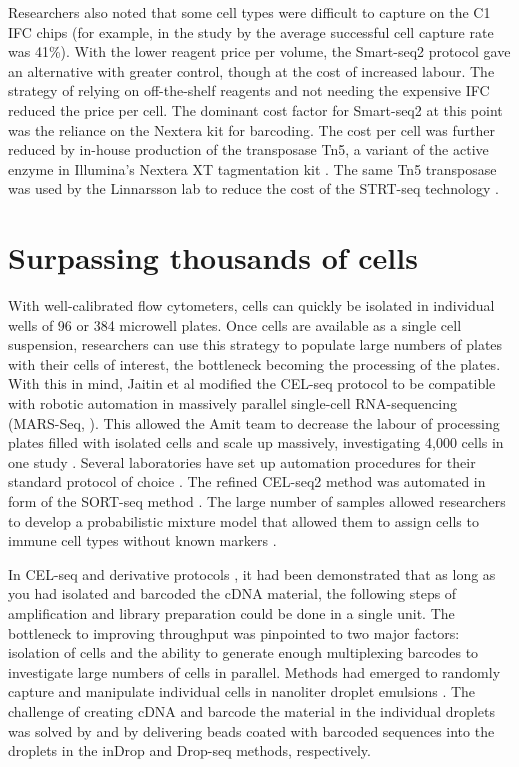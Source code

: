 Researchers also noted that some cell types were difficult to capture on the C1 IFC chips (for example, in the study by \citet{Zeisel2015-mk} the average successful cell capture rate was 41\%). With the lower reagent price per volume, the Smart-seq2 protocol gave an alternative with greater control, though at the cost of increased labour. The strategy of relying on off-the-shelf reagents and not needing the expensive IFC reduced the price per cell. The dominant cost factor for Smart-seq2 at this point was the reliance on the Nextera kit for barcoding. The cost per cell was further reduced by in-house production of the transposase Tn5, a variant of the active enzyme in Illumina’s Nextera XT tagmentation kit \cite{Picelli2014-ni}. The same Tn5 transposase was used by the Linnarsson lab to reduce the cost of the STRT-seq technology \cite{Islam2014-dx}.

\section{Surpassing thousands of cells}

With well-calibrated flow cytometers, cells can quickly be isolated in individual wells of 96 or 384 microwell plates. Once cells are available as a single cell suspension, researchers can use this strategy to populate large numbers of plates with their cells of interest, the bottleneck becoming the processing of the plates. With this in mind, Jaitin et al modified the CEL-seq protocol to be compatible with robotic automation in massively parallel single-cell RNA-sequencing (MARS-Seq, \citet{Jaitin2014-pk}). This allowed the Amit team to decrease the labour of processing plates filled with isolated cells and scale up massively, investigating 4,000 cells in one study \cite{Jaitin2014-pk}. Several laboratories have set up automation procedures for their standard protocol of choice \cite{Zeisel2015-mk, Soumillon2014-mf}. The refined CEL-seq2 method \cite{Hashimshony2016-ul} was automated in form of the SORT-seq method \cite{Muraro2016-zt}. The large number of samples allowed researchers to develop a probabilistic mixture model that allowed them to assign cells to immune cell types without known markers \cite{Jaitin2014-pk}.

In CEL-seq and derivative protocols \cite{Hashimshony2012-am, Jaitin2014-pk, Hashimshony2016-ul, Velten2015-ve}, it had been demonstrated that as long as you had isolated and barcoded the cDNA material, the following steps of amplification and library preparation could be done in a single unit. The bottleneck to improving throughput was pinpointed to two major factors: isolation of cells and the ability to generate enough multiplexing barcodes to investigate large numbers of cells in parallel. Methods had emerged to randomly capture and manipulate individual cells in nanoliter droplet emulsions \cite{Mazutis2013-rd}. The challenge of creating cDNA and barcode the material in the individual droplets was solved by \citet{Klein2015-ti} and \citet{Macosko2015-jb} by delivering beads coated with barcoded sequences into the droplets in the inDrop and Drop-seq methods, respectively.

